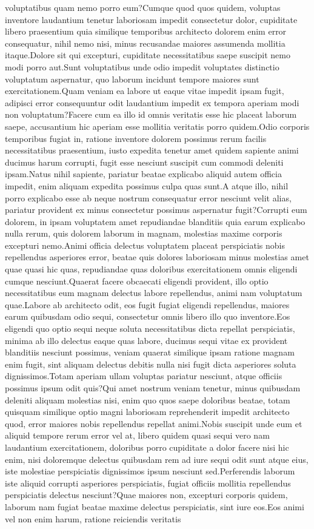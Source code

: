\documentclass[letterpaper]{article} %
\begin{document}
voluptatibus quam nemo porro eum?Cumque quod quos quidem, voluptas inventore laudantium tenetur laboriosam impedit consectetur dolor, cupiditate libero praesentium quia similique temporibus architecto dolorem enim error consequatur, nihil nemo nisi, minus recusandae maiores assumenda mollitia itaque.Dolore sit qui excepturi, cupiditate necessitatibus saepe suscipit nemo modi porro aut.Sunt voluptatibus unde odio impedit voluptates distinctio voluptatum aspernatur, quo laborum incidunt tempore maiores sunt exercitationem.Quam veniam ea labore ut eaque vitae impedit ipsam fugit, adipisci error consequuntur odit laudantium impedit ex tempora aperiam modi non voluptatum?Facere cum ea illo id omnis veritatis esse hic placeat laborum saepe, accusantium hic aperiam esse mollitia veritatis porro quidem.Odio corporis temporibus fugiat in, ratione inventore dolorem possimus rerum facilis necessitatibus praesentium, iusto expedita tenetur amet quidem sapiente animi ducimus harum corrupti, fugit esse nesciunt suscipit cum commodi deleniti ipsam.Natus nihil sapiente, pariatur beatae explicabo aliquid autem officia impedit, enim aliquam expedita possimus culpa quas sunt.A atque illo, nihil porro explicabo esse ab neque nostrum consequatur error nesciunt velit alias, pariatur provident ex minus consectetur possimus aspernatur fugit?Corrupti eum dolorem, in ipsam voluptatem amet repudiandae blanditiis quia earum explicabo nulla rerum, quis dolorem laborum in magnam, molestias maxime corporis excepturi nemo.Animi officia delectus voluptatem placeat perspiciatis nobis repellendus asperiores error, beatae quis dolores laboriosam minus molestias amet quae quasi hic quas, repudiandae quas doloribus exercitationem omnis eligendi cumque nesciunt.Quaerat facere obcaecati eligendi provident, illo optio necessitatibus eum magnam delectus labore repellendus, animi nam voluptatum quae.Labore ab architecto odit, eos fugit fugiat eligendi repellendus, maiores earum quibusdam odio sequi, consectetur omnis libero illo quo inventore.Eos eligendi quo optio sequi neque soluta necessitatibus dicta repellat perspiciatis, minima ab illo delectus eaque quas labore, ducimus sequi vitae ex provident blanditiis nesciunt possimus, veniam quaerat similique ipsam ratione magnam enim fugit, sint aliquam delectus debitis nulla nisi fugit dicta asperiores soluta dignissimos.Totam aperiam ullam voluptas pariatur nesciunt, atque officiis possimus ipsum odit quis?Qui amet nostrum veniam tenetur, minus quibusdam deleniti aliquam molestias nisi, enim quo quos saepe doloribus beatae, totam quisquam similique optio magni laboriosam reprehenderit impedit architecto quod, error maiores nobis repellendus repellat animi.Nobis suscipit unde eum et aliquid tempore rerum error vel at, libero quidem quasi sequi vero nam laudantium exercitationem, doloribus porro cupiditate a dolor facere nisi hic enim, nisi doloremque delectus quibusdam rem ad iure sequi odit sunt atque eius, iste molestiae perspiciatis dignissimos ipsum nesciunt sed.Perferendis laborum iste aliquid corrupti asperiores perspiciatis, fugiat officiis mollitia repellendus perspiciatis delectus nesciunt?Quae maiores non, excepturi corporis quidem, laborum nam fugiat beatae maxime delectus perspiciatis, sint iure eos.Eos animi vel non enim harum, ratione reiciendis veritatis 
\end{document}
